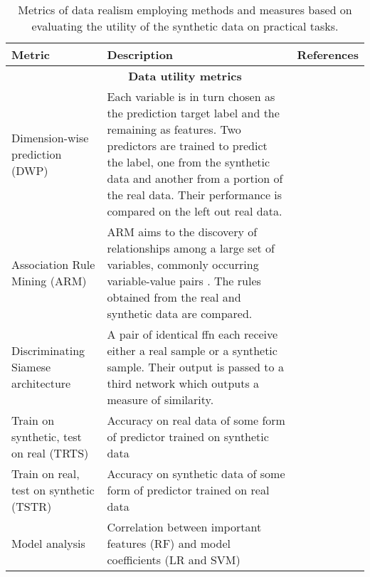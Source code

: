 \begin{table}[H]
        \footnotesize
        \caption{Metrics of data realism employing methods and measures based on evaluating the utility of the synthetic data on practical tasks.}\label{tab:aug-metrics}
        
        \begin{tabularx}{\textwidth}{@{} p{} X p{} @{}} \toprule
        Metric & Description & References\\ \midrule
        
        \multicolumn{3}{c}{\textbf{Data utility metrics}}\\ \midrule
        
        Dimension-wise prediction (DWP) & Each variable is in turn chosen as the prediction target label and the remaining as features. Two predictors are trained to predict the label, one from the synthetic data and another from a portion of the real data. Their performance is compared on the left out real data.  & \cite{Choi2017-nt,Camino2018-re,Goncalves2020,yan2020generating}\\[30pt]
        
        Association Rule Mining (ARM) & ARM aims to the discovery of relationships among a large set of variables, commonly occurring variable-value pairs \cite{Agrawal1993}. The rules obtained from the real and synthetic data are compared.  & \cite{baowaly_2019_IEEE,baowaly_2019_jamia,BaeAnomiGAN2020,yan2020generating}\\[30pt]
        
        Discriminating Siamese architecture & A pair of identical \gls{ffn} each receive either a real sample or a synthetic sample. Their output is passed to a third network which outputs a measure of similarity. & \cite{torfi2019generating}\\[30pt]
        
        Train on synthetic, test on real (TRTS) & Accuracy on real data of some form of predictor trained on synthetic data & \cite{Beaulieu-Jones2019-ct} \\ [30pt]
        
        Train on real, test on synthetic (TSTR) & Accuracy on synthetic data of some form of predictor trained on real data &  \cite{BaeAnomiGAN2020}\\[30pt]
        
        Model analysis & Correlation between important features (RF) and model coefficients (LR and SVM) & \cite{esteban2017real,Xu2019-ay,Yoon2020-anon,chin2019generation}\\[30pt]
        

\end{tabularx}
\end{table}

